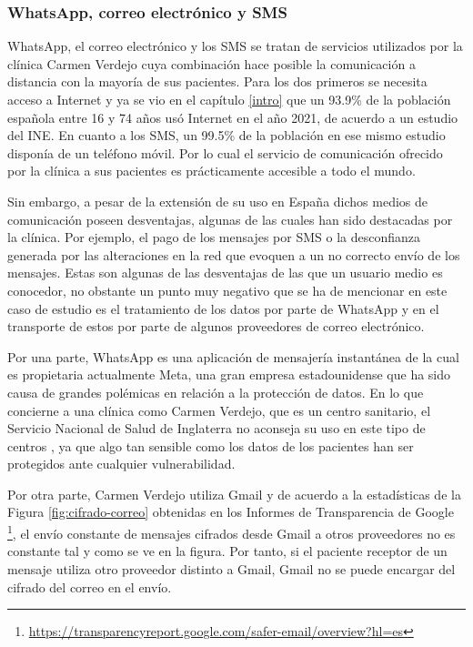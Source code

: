 \subsubsection*{WhatsApp, correo electrónico y SMS}

WhatsApp, el correo electrónico y los SMS se tratan de servicios utilizados por la clínica Carmen Verdejo cuya combinación hace posible la comunicación a distancia con la mayoría de sus pacientes. Para los dos primeros se necesita acceso a Internet y ya se vio en el capítulo \ref{intro} que un 93.9\% de la población española entre 16 y 74 años usó Internet en el año 2021, de acuerdo a un estudio del INE. En cuanto a los SMS, un 99.5\% de la población en ese mismo estudio disponía de un teléfono móvil. Por lo cual el servicio de comunicación ofrecido por la clínica a sus pacientes es prácticamente accesible a todo el mundo. \bigskip

Sin embargo, a pesar de la extensión de su uso en España dichos medios de comunicación poseen desventajas, algunas de las cuales han sido destacadas por la clínica. Por ejemplo, el pago de los mensajes por SMS o la desconfianza generada por las alteraciones en la red que evoquen a un no correcto envío de los mensajes. Estas son algunas de las desventajas de las que un usuario medio es conocedor, no obstante un punto muy negativo que se ha de mencionar en este caso de estudio es el tratamiento de los datos por parte de WhatsApp y en el transporte de estos por parte de algunos proveedores de correo electrónico. \bigskip

Por una parte, WhatsApp es una aplicación de mensajería instantánea de la cual es propietaria actualmente Meta, una gran empresa estadounidense que ha sido causa de grandes polémicas en relación a la protección de datos. En lo que concierne a una clínica como Carmen Verdejo, que es un centro sanitario, el Servicio Nacional de Salud de Inglaterra no aconseja su uso en este tipo de centros \cite{Gould2016-ky}, ya que algo tan sensible como los datos de los pacientes han ser protegidos ante cualquier vulnerabilidad. \bigskip

Por otra parte, Carmen Verdejo utiliza Gmail y de acuerdo a la estadísticas de la Figura \ref{fig:cifrado-correo} obtenidas en los Informes de Transparencia de Google \footnote{\url{https://transparencyreport.google.com/safer-email/overview?hl=es}}, el envío constante de mensajes cifrados desde Gmail a otros proveedores no es constante tal y como se ve en la figura. Por tanto, si el paciente receptor de un mensaje utiliza otro proveedor distinto a Gmail, Gmail no se puede encargar del cifrado del correo en el envío.

